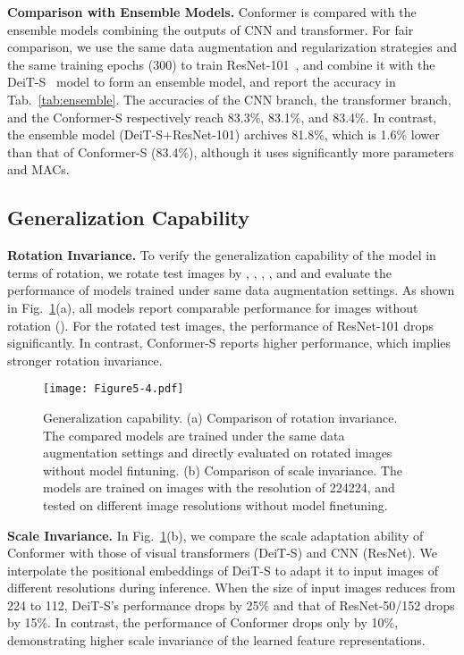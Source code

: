 \documentclass[10pt,twocolumn,letterpaper]{article}
\begin{document}
\noindent\textbf{Comparison with Ensemble Models.}
Conformer is compared with the ensemble models combining the outputs of CNN and transformer. For fair comparison, we use the same data augmentation and regularization strategies and the same training epochs (300) to train ResNet-101~\cite{ResNet2016}, and combine it with the DeiT-S~\cite{DeiT2020} model to form an ensemble model, and report the accuracy in Tab.~\ref{tab:ensemble}. The accuracies of the CNN branch, the transformer branch, and the Conformer-S respectively reach 83.3\%, 83.1\%, and 83.4\%. 
In contrast, the ensemble model (DeiT-S+ResNet-101) archives 81.8\%, which is 1.6\% lower than that of Conformer-S (83.4\%), although it uses significantly more parameters and MACs. 

\subsection{Generalization Capability}

\noindent\textbf{Rotation Invariance.}
To verify the generalization capability of the model in terms of rotation, we rotate test images by , , , ,  and  and evaluate the performance of models trained under same data augmentation settings.  As shown in Fig.~\ref{fig:generalization}(a), all models report comparable performance for images without rotation (). For the rotated test images, the performance of ResNet-101 drops significantly. In contrast, Conformer-S reports higher performance, which implies stronger rotation invariance.
~\\
\begin{figure}[t]
\begin{center}
\texttt{[image: Figure5-4.pdf]}
\end{center}
\vspace{-1em}
\caption{Generalization capability. (a) Comparison of rotation invariance. The compared models are trained under the same data augmentation settings and directly evaluated on rotated images without model fintuning. (b) Comparison of scale invariance. The models are trained on images with the resolution of 224224, and tested on different image resolutions without model finetuning.}
\label{fig:generalization}
\end{figure}


\noindent\textbf{Scale Invariance.}
In Fig.~\ref{fig:generalization}(b), we compare the scale adaptation ability of Conformer with those of visual transformers (DeiT-S) and CNN (ResNet). 
We interpolate the positional embeddings of DeiT-S to adapt it to input images of different resolutions during inference.
When the size of input images reduces from 224 to 112, DeiT-S's performance drops by 25\% and that of ResNet-50/152 drops by 15\%. In contrast, the performance of Conformer drops only by 10\%, demonstrating higher scale invariance of the learned feature representations.
\end{document}
